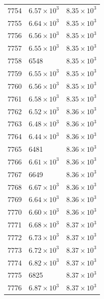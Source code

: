 \begin{table}[H]
\begin{tabular}{lll}
7754 & $\displaystyle 6.57 \times 10^{3}$ & $\displaystyle 8.35 \times 10^{3}$ \\
7755 & $\displaystyle 6.64 \times 10^{3}$ & $\displaystyle 8.35 \times 10^{3}$ \\
7756 & $\displaystyle 6.56 \times 10^{3}$ & $\displaystyle 8.35 \times 10^{3}$ \\
7757 & $\displaystyle 6.55 \times 10^{3}$ & $\displaystyle 8.35 \times 10^{3}$ \\
7758 & 6548 & $\displaystyle 8.35 \times 10^{3}$ \\
7759 & $\displaystyle 6.55 \times 10^{3}$ & $\displaystyle 8.35 \times 10^{3}$ \\
7760 & $\displaystyle 6.56 \times 10^{3}$ & $\displaystyle 8.35 \times 10^{3}$ \\
7761 & $\displaystyle 6.58 \times 10^{3}$ & $\displaystyle 8.35 \times 10^{3}$ \\
7762 & $\displaystyle 6.52 \times 10^{3}$ & $\displaystyle 8.36 \times 10^{3}$ \\
7763 & $\displaystyle 6.48 \times 10^{3}$ & $\displaystyle 8.36 \times 10^{3}$ \\
7764 & $\displaystyle 6.44 \times 10^{3}$ & $\displaystyle 8.36 \times 10^{3}$ \\
7765 & 6481 & $\displaystyle 8.36 \times 10^{3}$ \\
7766 & $\displaystyle 6.61 \times 10^{3}$ & $\displaystyle 8.36 \times 10^{3}$ \\
7767 & 6649 & $\displaystyle 8.36 \times 10^{3}$ \\
7768 & $\displaystyle 6.67 \times 10^{3}$ & $\displaystyle 8.36 \times 10^{3}$ \\
7769 & $\displaystyle 6.64 \times 10^{3}$ & $\displaystyle 8.36 \times 10^{3}$ \\
7770 & $\displaystyle 6.60 \times 10^{3}$ & $\displaystyle 8.36 \times 10^{3}$ \\
7771 & $\displaystyle 6.68 \times 10^{3}$ & $\displaystyle 8.37 \times 10^{3}$ \\
7772 & $\displaystyle 6.73 \times 10^{3}$ & $\displaystyle 8.37 \times 10^{3}$ \\
7773 & $\displaystyle 6.72 \times 10^{3}$ & $\displaystyle 8.37 \times 10^{3}$ \\
7774 & $\displaystyle 6.82 \times 10^{3}$ & $\displaystyle 8.37 \times 10^{3}$ \\
7775 & 6825 & $\displaystyle 8.37 \times 10^{3}$ \\
7776 & $\displaystyle 6.87 \times 10^{3}$ & $\displaystyle 8.37 \times 10^{3}$ \\

\end{tabular}
\end{table}
